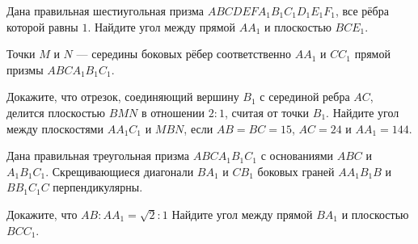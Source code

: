 \begin{class}[number=9]
	\begin{listofex}
		\item Дана правильная шестиугольная призма \(ABCDEFA_1B_1C_1D_1E_1F_1\), все рёбра которой равны \(1\). Найдите угол между прямой \(AA_1\) и плоскостью \(BCE_1\).
		\item Точки \(M\) и \(N\) --- середины боковых рёбер соответственно \(AA_1\) и \(CC_1\) прямой призмы \(ABCA_1B_1C_1\).
		\begin{tasks}
			\task Докажите, что отрезок, соединяющий вершину \(B_1\) с серединой ребра \(AC\), делится плоскостью \(BMN\) в отношении \(2 : 1\), считая от точки \(B_1\).
			\task Найдите угол между плоскостями \(AA_1C_1\) и \(MBN\), если \(AB=BC=15\), \(AC =24\) и \(AA_1 =144\).
		\end{tasks}
		\item Дана правильная треугольная призма \(ABCA_1B_1C_1\) с основаниями \(ABC\) и \(A_1B_1C_1\). Скрещивающиеся диагонали \(BA_1\) и \(CB_1\) боковых граней \(AA_1B_1B\) и \(BB_1C_1C\) перпендикулярны.
		\begin{tasks}
			\task Докажите, что \(AB:AA_1=\sqrt{2}:1\)
			\task Найдите угол между прямой \(BA_1\) и плоскостью \(BCC_1\).
		\end{tasks}
	\end{listofex}
\end{class}



